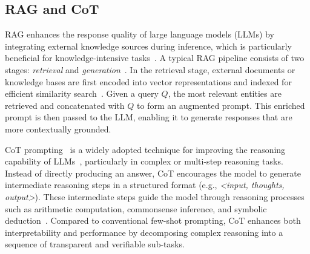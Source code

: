 \subsection{RAG and CoT}

RAG enhances the response quality of large language models (LLMs) by integrating external knowledge sources during inference, which is particularly beneficial for knowledge-intensive tasks~\cite{huang2025survey}. 
A typical RAG pipeline consists of two stages: \textit{retrieval} and \textit{generation}~\cite{gao2023retrieval}. 
In the retrieval stage, external documents or knowledge bases are first encoded into vector representations and indexed for efficient similarity search~\cite{10.5555/3495724.3496517}. 
Given a query $Q$, the most relevant entities are retrieved and concatenated with $Q$ to form an augmented prompt. 
This enriched prompt is then passed to the LLM, enabling it to generate responses that are more contextually grounded.

CoT prompting~\cite{wei2022chain} is a widely adopted technique for improving the reasoning capability of LLMs~\cite{chen2025towards}, particularly in complex or multi-step reasoning tasks. 
Instead of directly producing an answer, CoT encourages the model to generate intermediate reasoning steps in a structured format (e.g., \textit{<input, thoughts, output>}). 
These intermediate steps guide the model through reasoning processes such as arithmetic computation, commonsense inference, and symbolic deduction~\cite{wang2022self, lyu2023faithful}. 
Compared to conventional few-shot prompting, CoT enhances both interpretability and performance by decomposing complex reasoning into a sequence of transparent and verifiable sub-tasks.




